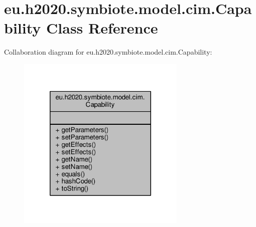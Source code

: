 \hypertarget{classeu_1_1h2020_1_1symbiote_1_1model_1_1cim_1_1Capability}{}\section{eu.\+h2020.\+symbiote.\+model.\+cim.\+Capability Class Reference}
\label{classeu_1_1h2020_1_1symbiote_1_1model_1_1cim_1_1Capability}


Collaboration diagram for eu.\+h2020.\+symbiote.\+model.\+cim.\+Capability\+:
\nopagebreak
\begin{figure}[H]
\begin{center}
\leavevmode
\includegraphics[width=228pt]{classeu_1_1h2020_1_1symbiote_1_1model_1_1cim_1_1Capability__coll__graph}
\end{center}
\end{figure}

